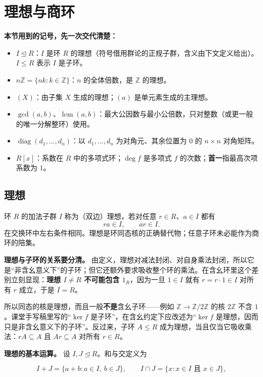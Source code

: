 \section{理想与商环}


\textbf{本节用到的记号，先一次交代清楚：}

\begin{itemize}
\item $I\trianglelefteq R$：$I$ 是环 $R$ 的理想（符号借用群论的正规子群，含义由下文定义给出）。$I\le R$ 表示 $I$ 是子环。
\item $n\mathbb Z=\{nk:k\in\mathbb Z\}$：$n$ 的全体倍数，是 $\mathbb Z$ 的理想。
\item $(X)$：由子集 $X$ 生成的理想；$(a)$ 是单元素生成的主理想。
\item $\gcd(a,b)$、$\operatorname{lcm}(a,b)$：最大公因数与最小公倍数，只对整数（或更一般的唯一分解整环）使用。
\item $\operatorname{diag}(d_1,\dots,d_n)$：以 $d_1,\dots,d_n$ 为对角元、其余位置为 $0$ 的 $n\times n$ 对角矩阵。
\item $R[x]$：系数在 $R$ 中的多项式环；$\deg f$ 是多项式 $f$ 的次数；\textbf{首一}指最高次项系数为 $1$。
\end{itemize}


\subsection{理想}


环 $R$ 的加法子群 $I$ 称为（双边）理想，若对任意 $r\in R$、$a\in I$ 都有
\[ra\in I,\qquad ar\in I.\]
在交换环中左右条件相同。理想是环同态核的正确替代物；任意子环未必能作为商环的陪集。

\textbf{理想与子环的关系要分清。} 由定义，理想对减法封闭、对自身乘法封闭，所以它是“非含幺意义下”的子环；但它还额外要求吸收整个环的乘法。在含幺环里这个差别立刻显现：\textbf{理想 $I\ne R$ 不可能包含 $1_R$}，因为一旦 $1\in I$ 就有 $r=r\cdot1\in I$ 对所有 $r$ 成立，于是 $I=R$。

所以同态的核是理想，而且一般\textbf{不是}含幺子环——例如 $\mathbb Z\to\mathbb Z/2\mathbb Z$ 的核 $2\mathbb Z$ 不含 $1$。课堂手写稿里写的“$\ker f$ 是子环”，在含幺约定下应改述为“$\ker f$ 是理想，因而只是非含幺意义下的子环”。反过来，子环 $A\le R$ 成为理想，当且仅当它吸收乘法：$rA\subseteq A$ 且 $Ar\subseteq A$ 对所有 $r\in R$。

\textbf{理想的基本运算。} 设 $I,J\trianglelefteq R$。和与交定义为

\[
I+J=\{a+b:a\in I,\ b\in J\},\qquad I\cap J=\{x:x\in I\text{ 且 }x\in J\},
\]

